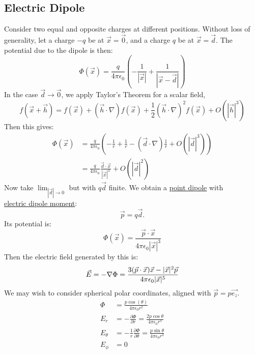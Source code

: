 \documentclass[../Main.tex]{subfiles}
\begin{document}
\subsection{Electric Dipole}
Consider two equal and opposite charges at different positions. Without loss of generality, let a charge $-q$ be at $\vec{x} = \vec0$, and a charge $q$ be at $\vec{x} = \vec{d}$.
The potential due to the dipole is then:
\begin{equation*}
    \Phi(\vec{x}) = \frac{q}{4\pi \epsilon_0} \left(-\frac{1}{|\vec{x}|} + \frac{1}{|\vec{x} - \vec{d}|}\right)
\end{equation*}
In the case $\vec{d} \to \vec0$, we apply Taylor's Theorem for a scalar field,
\begin{equation*}
    f(\vec{x} + \vec{h}) = f(\vec{x}) + (\vec{h} \cdot \nabla)f(\vec{x}) + \frac12 (\vec{h} \cdot \nabla)^2 f(\vec{x}) + O(|\vec{h}|^3)
\end{equation*}
Then this gives:
\begin{align*}
    \Phi(\vec{x}) &= \frac{q}{4 \pi \epsilon_0} \left(-\frac{1}{r} + \frac{1}{r} - (\vec{d} \cdot \nabla) \frac1r + O(|\vec{d}|^3)\right) \\
    &= \frac{q}{4\pi \epsilon_0} \frac{\vec{d} \cdot \vec{x}}{|\vec{x}|^3} + O(|\vec{d}|^2)
\end{align*}
Now take $\lim_{|\vec{d}| \to 0}$ but with $q \vec{d}$ finite. We obtain a \underline{point dipole} with\\\underline{electric dipole moment}:
\begin{equation*}
    \vec{p} = q\vec{d}.
\end{equation*}
Its potential is:
\begin{equation*}
    \Phi(\vec{x}) = \frac{\vec{p} \cdot \vec{x}}{4\pi \epsilon_0 |\vec{x}|^3}
\end{equation*}
Then the electric field generated by this is:
\begin{equation*}
    \vec{E} = - \nabla \Phi = \frac{3(\vec{p} \cdot \vec{x}) \vec{x} - |\vec{x}|^2 \vec{p}}{4\pi \epsilon_0 |\vec{x}|^5} \\
\end{equation*}
We may wish to consider spherical polar coordinates, aligned with $\vec{p} = p \vec{e_z}$.
\begin{align*}
    \Phi &= \frac{p \cos(\theta)}{4\pi \epsilon_0 r^2} \\
    E_r &= -\frac{\partial \Phi}{\partial r} = \frac{2p\cos\theta}{4\pi\epsilon_0 r^3} \\
    E_\theta &= -\frac1r\frac{\partial \Phi}{\partial \theta} = \frac{p\sin\theta}{4\pi\epsilon_0 r^3} \\
    E_\phi &= 0
\end{align*}
\end{document}
